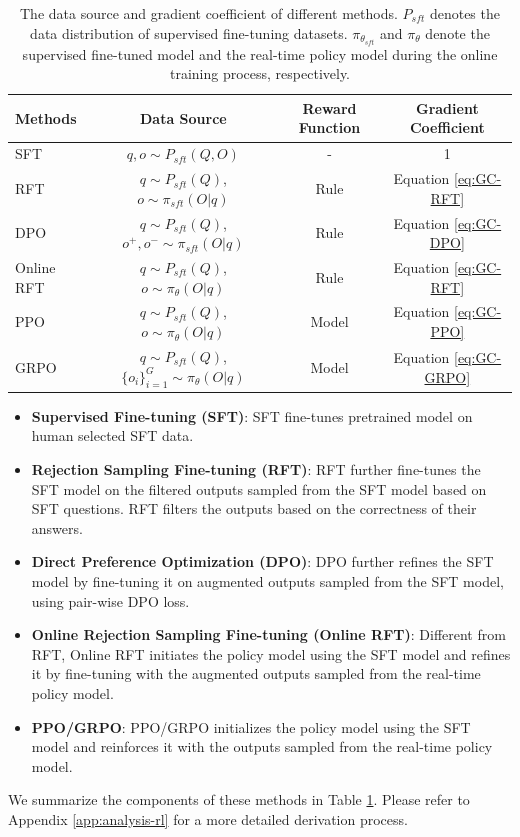 \begin{table}[t]
    \centering
    \begin{small}
    \begin{tabular}{lccc}
    \toprule
     \textbf{Methods} & \textbf{Data Source}  & \textbf{Reward Function} & \textbf{Gradient Coefficient}  \\
    \midrule
    SFT & $q, o \sim P_{sft}(Q, O)$& - &  1 \\
    \midrule
    RFT  & $q \sim P_{sft}(Q)$, $o \sim \pi_{sft}(O|q)$ & Rule & Equation \ref{eq:GC-RFT} \\
     DPO & $q \sim P_{sft}(Q)$, $o^+, o^- \sim \pi_{sft}(O|q)$ & Rule & Equation \ref{eq:GC-DPO} \\
    \midrule
    Online RFT  & $q \sim P_{sft}(Q)$, $o \sim \pi_{\theta}(O|q)$ & Rule & Equation \ref{eq:GC-RFT} \\
    PPO & $q \sim P_{sft}(Q)$, $o \sim \pi_{\theta}(O|q)$ & Model & Equation \ref{eq:GC-PPO} \\
    GRPO & $q \sim P_{sft}(Q)$, $\{o_i\}_{i=1}^G \sim \pi_{\theta}(O|q)$ & Model & Equation \ref{eq:GC-GRPO} \\
    
    \bottomrule
    \end{tabular}
    \end{small}
    \caption{The data source and gradient coefficient of different methods. $P_{sft}$ denotes the data distribution of supervised fine-tuning datasets. $\pi_{\theta_{sft}}$ and $\pi_{\theta}$ denote the supervised fine-tuned model and the real-time policy model during the online training process, respectively.}
    \label{tab:data_policy}
    
\end{table}

\begin{itemize}
    \item  \textbf{Supervised Fine-tuning (SFT)}: SFT fine-tunes pretrained model on human selected SFT data.
    \item \textbf{Rejection Sampling Fine-tuning (RFT)}: RFT further fine-tunes the SFT model on the filtered outputs sampled from the SFT model based on SFT questions. RFT filters the outputs based on the correctness of their answers.
    \item \textbf{Direct Preference Optimization (DPO)}: DPO further refines the SFT model by fine-tuning it on augmented outputs sampled from the SFT model, using pair-wise DPO loss.
    \item \textbf{Online Rejection Sampling Fine-tuning (Online RFT)}: Different from RFT, Online RFT initiates the policy model using the SFT model and refines it by fine-tuning with the augmented outputs sampled from the real-time policy model.
    \item \textbf{PPO/GRPO}: PPO/GRPO initializes the policy model using the SFT model and reinforces it with the outputs sampled from the real-time policy model.
\end{itemize}
We summarize the components of these methods in Table \ref{tab:data_policy}.
Please refer to Appendix \ref{app:analysis-rl} for a more detailed derivation process.

